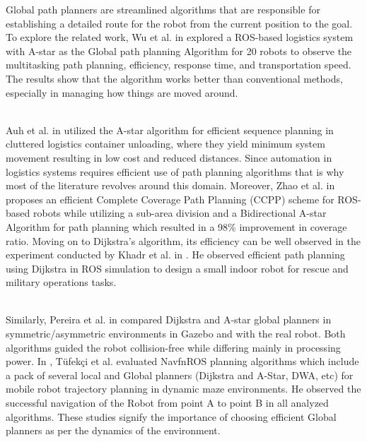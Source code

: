 \documentclass[sigconf]{acmart}
\begin{document}
Global path planners are streamlined algorithms that are responsible for establishing a detailed route for the robot from the current position to the goal. To explore the related work, Wu et al. in \cite{b1} explored a ROS-based logistics system with A-star as the Global path planning Algorithm for 20 robots to observe the multitasking path planning, efficiency, response time, and transportation speed. The results show that the algorithm works better than conventional methods, especially in managing how things are moved around. 

\\
Auh et al. in \cite{b2} utilized the A-star algorithm for efficient sequence planning in cluttered logistics container unloading, where they yield minimum system movement resulting in low cost and reduced distances. Since automation in logistics systems requires efficient use of path planning algorithms that is why most of the literature revolves around this domain. Moreover, Zhao et al. in \cite{b3} proposes an efficient Complete Coverage Path Planning (CCPP) scheme for ROS-based robots while utilizing a sub-area division and a Bidirectional A-star Algorithm for path planning which resulted in a 98\% improvement in coverage ratio. Moving on to Dijkstra's algorithm, its efficiency can be well observed in the experiment conducted by Khadr et al. in \cite{b4}. He observed efficient path planning using Dijkstra in ROS simulation to design a small indoor robot for rescue and military operations tasks. 

\\
Similarly, Pereira et al. in \cite {b5} compared Dijkstra and A-star global planners in symmetric/asymmetric environments in Gazebo and with the real robot. Both algorithms guided the robot collision-free while differing mainly in processing power. In \cite {b6}, Tüfekçi et al. evaluated NavfnROS planning algorithms which include a pack of several local and Global planners (Dijkstra and A-Star, DWA, etc) for mobile robot trajectory planning in dynamic maze environments. He observed the successful navigation of the Robot from point A to point B in all analyzed algorithms. These studies signify the importance of choosing efficient Global planners as per the dynamics of the environment.
\end{document}
